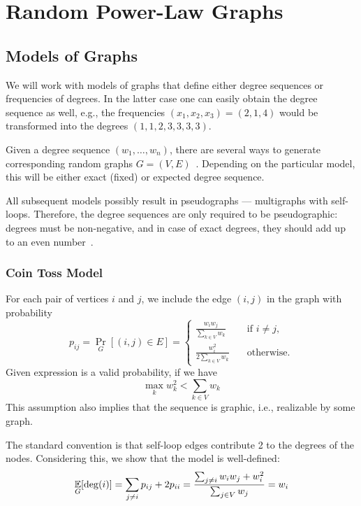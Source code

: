 \chapter{Random Power-Law Graphs}
\label{ch:powerlaw}

\section{Models of Graphs}

We will work with models of graphs that define either degree sequences or frequencies of degrees.
In the latter case one can easily obtain the degree sequence as well,
e.g., the frequencies $(x_1,x_2,x_3)=(2,1,4)$ would be transformed into the degrees $(1,1,2,3,3,3,3)$.

Given a degree sequence $(w_1,\ldots,w_n)$, there are several ways to generate corresponding random graphs $G=(V,E)$~\cite{hop08}.
Depending on the particular model, this will be either exact (fixed) or expected degree sequence.

All subsequent models possibly result in pseudographs --- multigraphs with self-loops.
Therefore, the degree sequences are only required to be pseudographic:
degrees must be non-negative, and in case of exact degrees, they should add up to an even number~\cite{hak62}.

\subsection{Coin Toss Model}
\label{subsec:coin-toss-model}

For each pair of vertices $i$ and $j$, we include the edge $(i,j)$ in the graph with probability
\begin{equation}
    p_{ij}=\Pr_G[(i,j)\in E]=
    \begin{cases}
        \frac{w_i w_j}{\sum_{k\in V}{w_k}} & \quad \text{if }i\neq j,\\
        \frac{w_i^2}{2\sum_{k\in V}{w_k}} & \quad \text{otherwise}.
    \end{cases}
\end{equation}
Given expression is a valid probability, if we have
\begin{equation}
    \label{eq:coin-toss-assumption}
    \max_k w_k^2<\sum_{k\in V}{w_k}
\end{equation}
This assumption also implies that the sequence is graphic,
i.e., realizable by some graph.

The standard convention is that self-loop edges contribute 2 to the degrees of the nodes.
Considering this, we show that the model is well-defined:
\begin{equation}
    \mathop{{}\mathbb{E}}_G[\deg(i)]=\sum_{j\neq i}{p_{ij}}+2p_{ii}
    =\frac{\sum_{j\neq i}{w_i w_j}+w_i^2}{\sum_{j\in V}{w_j}}=w_i
\end{equation}

